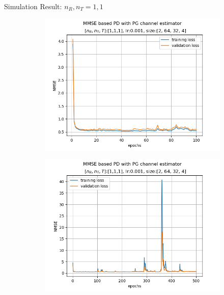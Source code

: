 \documentclass[hyperref={bookmarks=false}]{beamer}
\numberwithin{figure}{section}
\begin{document}
\begin{frame}{Simulation Result: $n_R, n_T = 1, 1$}

\begin{figure}[h!]
    \begin{subfigure}[b]{0.33\linewidth}
      \includegraphics[width=\linewidth]{240502/lr0.001_[2, 64, 32, 4]_ep100.png}
    \end{subfigure}
    \begin{subfigure}[b]{0.33\linewidth}
      \includegraphics[width=\linewidth]{240502/lr0.001_[2, 64, 32, 4]_ep500.png}

\end{subfigure}
\end{figure}
\end{frame}
\end{document}
